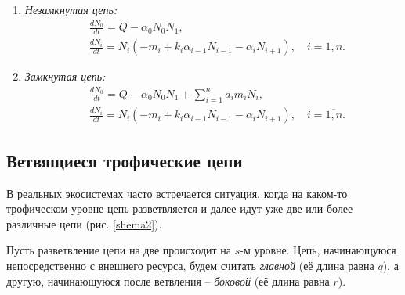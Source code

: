 \begin{enumerate}[label={\asbuk*)}, ref=\asbuk*]
    \item \textit{Незамкнутая цепь:}
    \begin{equation}  \label{flow}
        \begin{split}
            & \frac{dN_0}{dt} = Q - \alpha_0 N_0 N_1, \\
            & \frac{dN_i}{dt} = N_i (-m_i + k_i \alpha_{i-1} N_{i-1}  - \alpha_i N_{i+1}), \quad i=\overline{1,n}.
        \end{split}
    \end{equation}

    \item \textit{Замкнутая цепь:}
    \begin{equation} \label{cycle}
        \begin{split}
            & \frac{dN_0}{dt} = Q - \alpha_0 N_0 N_1  + \sum_{i=1}^{n} a_i m_i N_i, \\
            & \frac{dN_i}{dt} = N_i (-m_i + k_i \alpha_{i-1} N_{i-1}  - \alpha_i N_{i+1}), \quad i=\overline{1,n}.
        \end{split}
    \end{equation}
\end{enumerate}


\subsection{Ветвящиеся трофические цепи}
В реальных экосистемах часто встречается ситуация, когда на каком-то трофическом уровне цепь разветвляется и далее идут уже две или более различные цепи (рис. \ref{shema2}). 

Пусть разветвление цепи на две происходит на \(s\)-м уровне. Цепь, начинающуюся непосредственно с внешнего ресурса, будем считать \textit{главной} (её длина равна \(q\)), а другую, начинающуюся после ветвления -- \textit{боковой} (её длина равна \(r\)).



